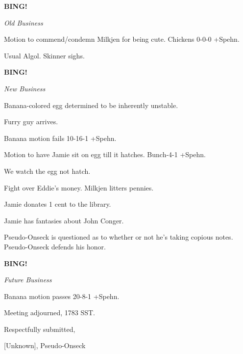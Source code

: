 \documentclass[12pt]{article}
\newcommand{\bing}{{\bf BING!} }
\newcommand{\goto}[1]{\bing \vskip 12pt \centerline{{\em{#1}}}}
\begin{document}
\goto{Old Business}

Motion to commend/condemn Milkjen for being cute. Chickens 0-0-0 +Spehn.

Usual Algol. Skinner sighs.

\goto{New Business}

Banana-colored egg determined to be inherently unstable.

Furry guy arrives.

Banana motion fails 10-16-1 +Spehn.

Motion to have Jamie sit on egg till it hatches. Bunch-4-1 +Spehn.

We watch the egg not hatch.

Fight over Eddie's money. Milkjen litters pennies.

Jamie donates 1 cent to the library.

Jamie has fantasies about John Conger.

Pseudo-Onseck is questioned as to whether or not he's taking copious notes. Pseudo-Onseck defends his honor.

\goto{Future Business}

Banana motion passes 20-8-1 +Spehn.

\vspace{12pt}

\noindent
Meeting adjourned, 1783 SST.

\vspace{18pt}

\centerline{Respectfully submitted,}
\centerline{[Unknown], Pseudo-Onseck}
\end{document}

